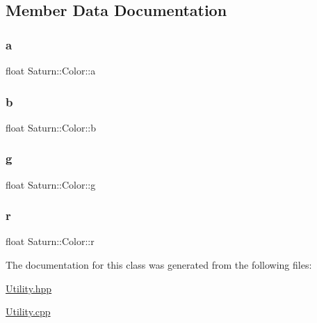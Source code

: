 \subsection{Member Data Documentation}
\mbox{\label{class_saturn_1_1_color_ad6edfed731cab7751d9efd28efbb9c2e}} 
\subsubsection{\texorpdfstring{a}{a}}
{\footnotesize\ttfamily float Saturn\+::\+Color\+::a}

\mbox{\label{class_saturn_1_1_color_af4f29a4f2250895c42b2312a2d862405}} 
\subsubsection{\texorpdfstring{b}{b}}
{\footnotesize\ttfamily float Saturn\+::\+Color\+::b}

\mbox{\label{class_saturn_1_1_color_ada6898d30a7eef561cf77a35b8a418d7}} 
\subsubsection{\texorpdfstring{g}{g}}
{\footnotesize\ttfamily float Saturn\+::\+Color\+::g}

\mbox{\label{class_saturn_1_1_color_a0f9197cb78d63428003a39ee6864508a}} 
\subsubsection{\texorpdfstring{r}{r}}
{\footnotesize\ttfamily float Saturn\+::\+Color\+::r}



The documentation for this class was generated from the following files\+:\begin{DoxyCompactItemize}
\item 
\mbox{\hyperlink{_utility_8hpp}{Utility.\+hpp}}\item 
\mbox{\hyperlink{_utility_8cpp}{Utility.\+cpp}}\end{DoxyCompactItemize}
